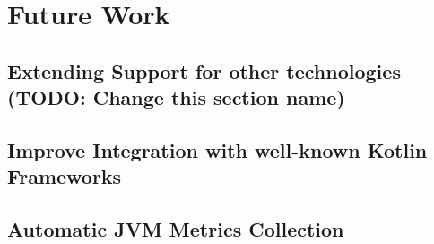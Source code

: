 \usepackage{lipsum}


\chapter{Future Work} \label{cap:future}


\section{Extending Support for other technologies (TODO: Change this section name)}
\lipsum[1]


\section{Improve Integration with well-known Kotlin Frameworks}
\lipsum[1]


\section{Automatic JVM Metrics Collection}
\lipsum[1]

